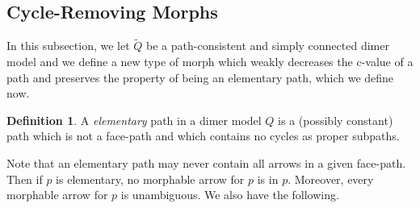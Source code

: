 \documentclass{article}
\theoremstyle{definition}
\newtheorem{defn}[thm]{Definition}
\begin{document}
\subsection{Cycle-Removing Morphs}

In this subsection, we let $\widetilde Q$ be a path-consistent and simply connected dimer model and we define a new type of morph which weakly decreases the c-value of a path and preserves the property of being an elementary path, which we define now.

\begin{defn}\label{defn:elementary}
	A \textit{elementary} path in a dimer model $Q$ is a (possibly constant) path which is not a face-path and which contains no cycles as proper subpaths.
\end{defn}

Note that an elementary path may never contain all arrows in a given face-path. 
Then if $p$ is elementary, no morphable arrow for $p$ is in $p$. Moreover, every morphable arrow for $p$ is unambiguous. We also have the following.
\end{document}
